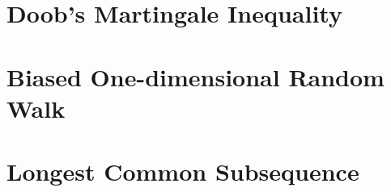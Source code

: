 \documentclass[12pt,letterpaper]{article}
\begin{document}
\section{Doob's Martingale Inequality}

\section{Biased One-dimensional Random Walk}

\section{Longest Common Subsequence}
\end{document}
